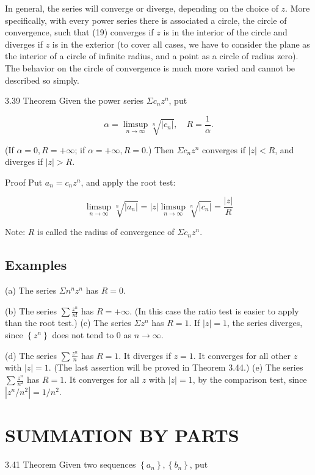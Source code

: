 \documentclass[10pt]{article}
\begin{document}
In general, the series will converge or diverge, depending on the choice of $z$. More specifically, with every power series there is associated a circle, the circle of convergence, such that (19) converges if $z$ is in the interior of the circle and diverges if $z$ is in the exterior (to cover all cases, we have to consider the plane as the interior of a circle of infinite radius, and a point as a circle of radius zero). The behavior on the circle of convergence is much more varied and cannot be described so simply.

3.39 Theorem Given the power series $\Sigma c_{n} z^{n}$, put

$$
\alpha=\limsup _{n \rightarrow \infty} \sqrt[n]{\left|c_{n}\right|}, \quad R=\frac{1}{\alpha} .
$$

(If $\alpha=0, R=+\infty$; if $\alpha=+\infty, R=0$.) Then $\Sigma c_{n} z^{n}$ converges if $|z|<R$, and diverges if $|z|>R$.

Proof Put $a_{n}=c_{n} z^{n}$, and apply the root test:

$$
\limsup _{n \rightarrow \infty} \sqrt[n]{\left|a_{n}\right|}=|z| \limsup _{n \rightarrow \infty} \sqrt[n]{\left|c_{n}\right|}=\frac{|z|}{R}
$$

Note: $R$ is called the radius of convergence of $\Sigma c_{n} z^{n}$.

\subsection{Examples}
(a) The series $\Sigma n^{n} z^{n}$ has $R=0$.

(b) The series $\sum \frac{z^{n}}{n !}$ has $R=+\infty$. (In this case the ratio test is easier to apply than the root test.) (c) The series $\Sigma z^{n}$ has $R=1$. If $|z|=1$, the series diverges, since $\left\{z^{n}\right\}$ does not tend to 0 as $n \rightarrow \infty$.

(d) The series $\sum \frac{z^{n}}{n}$ has $R=1$. It diverges if $z=1$. It converges for all other $z$ with $|z|=1$. (The last assertion will be proved in Theorem 3.44.) (e) The series $\sum \frac{z^{n}}{n^{2}}$ has $R=1$. It converges for all $z$ with $|z|=1$, by the comparison test, since $\left|z^{n} / n^{2}\right|=1 / n^{2}$.

\section{SUMMATION BY PARTS}
3.41 Theorem Given two sequences $\left\{a_{n}\right\},\left\{b_{n}\right\}$, put
\end{document}

